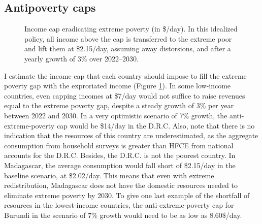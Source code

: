 \documentclass[12pt,english]{article}
\begin{document}
\subsection{Antipoverty caps}

\begin{figure}[!b]
  \caption[Anti-extreme-poverty cap in 2030 after 3\% growth.]{Income cap eradicating extreme poverty (in \$/day). In this idealized policy, all income above the cap is transferred to the extreme poor and lift them at \$2.15/day, assuming away distorsions, and after a yearly growth of 3\% over 2022--2030. %
  }\label{fig:antipoverty_cap}
\end{figure} 

I estimate the income cap that each country should impose to fill the extreme poverty gap with the exproriated income (Figure \ref{fig:antipoverty_cap}). 
In some low-income countries, even capping incomes at \$7/day would not suffice to raise revenues equal to the extreme poverty gap, despite a steady growth of 3\% per year between 2022 and 2030. 
In a very optimistic scenario of 7\% growth, the anti-extreme-poverty cap would be \$14/day in the D.R.C. Also, note that there is no indication that the resources of this country are underestimated, as the aggregate consumption from household surveys is greater than HFCE %
from national accounts for the D.R.C. 
Besides, the D.R.C. is not the poorest country. 
In Madagascar, the average consumption would fall short of \$2.15/day in the baseline scenario, at \$2.02/day. This means that even with extreme redistribution, Madagascar does not have the domestic resources needed to eliminate extreme poverty by 2030. 
To give one last example of the shortfall of resources in the lowest-income countries, the anti-extreme-poverty cap for Burundi in the scenario of 7\% growth would need to be as low as 8.60\$/day. 
\end{document}
